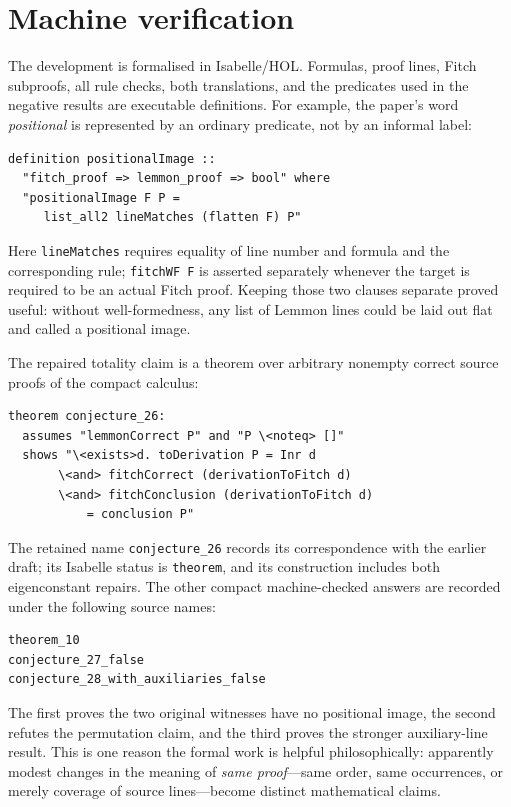 \documentclass[11pt]{article}
\theoremstyle{plain}
\theoremstyle{definition}
\theoremstyle{remark}
\begin{document}
\section{Machine verification}\label{sec:machine}

The development is formalised in Isabelle/HOL. Formulas, proof lines, Fitch
subproofs, all rule checks, both translations, and the predicates used in the
negative results are executable definitions. For example, the paper's word
\emph{positional} is represented by an ordinary predicate, not by an informal
label:

\begin{lstlisting}[language={}]
definition positionalImage ::
  "fitch_proof => lemmon_proof => bool" where
  "positionalImage F P =
     list_all2 lineMatches (flatten F) P"
\end{lstlisting}

\noindent Here \verb|lineMatches| requires equality of line number and formula
and the corresponding rule; \verb|fitchWF F| is asserted separately whenever
the target is required to be an actual Fitch proof. Keeping those two clauses
separate proved useful: without well-formedness, any list of Lemmon lines could
be laid out flat and called a positional image.

The repaired totality claim is a theorem over arbitrary nonempty correct
source proofs of the compact calculus:

\begin{lstlisting}[language={}]
theorem conjecture_26:
  assumes "lemmonCorrect P" and "P \<noteq> []"
  shows "\<exists>d. toDerivation P = Inr d
       \<and> fitchCorrect (derivationToFitch d)
       \<and> fitchConclusion (derivationToFitch d)
           = conclusion P"
\end{lstlisting}

\noindent The retained name \verb|conjecture_26| records its correspondence
with the earlier draft; its Isabelle status is \verb|theorem|, and its
construction includes both eigenconstant repairs. The other compact
machine-checked answers are recorded under the following source names:

\begin{lstlisting}[language={}]
theorem_10
conjecture_27_false
conjecture_28_with_auxiliaries_false
\end{lstlisting}

\noindent The first proves the two original witnesses have no positional
image, the second refutes the permutation claim, and the third proves the
stronger auxiliary-line result. This is one reason the formal work is helpful
philosophically: apparently modest changes in the meaning of \emph{same
proof}---same order, same occurrences, or merely coverage of source
lines---become distinct mathematical claims.
\end{document}

